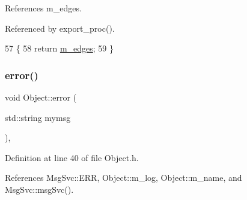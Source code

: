 References m\+\_\+edges.



Referenced by export\+\_\+proc().


\begin{DoxyCode}
57                            \{  
58     \textcolor{keywordflow}{return} \hyperlink{classHisto1D_a4188c6d1b4bfc8f9d8bde7616b4dbf5b}{m\_edges};
59   \}
\end{DoxyCode}
\mbox{\label{classObject_a204a95f57818c0f811933917a30eff45}} 
\subsubsection{\texorpdfstring{error()}{error()}\hspace{0.1cm}{\footnotesize\ttfamily [1/2]}}
{\footnotesize\ttfamily void Object\+::error (\begin{DoxyParamCaption}\item[{std\+::string}]{mymsg }\end{DoxyParamCaption})\hspace{0.3cm}{\ttfamily [inline]}, {\ttfamily [inherited]}}



Definition at line 40 of file Object.\+h.



References Msg\+Svc\+::\+E\+RR, Object\+::m\+\_\+log, Object\+::m\+\_\+name, and Msg\+Svc\+::msg\+Svc().




